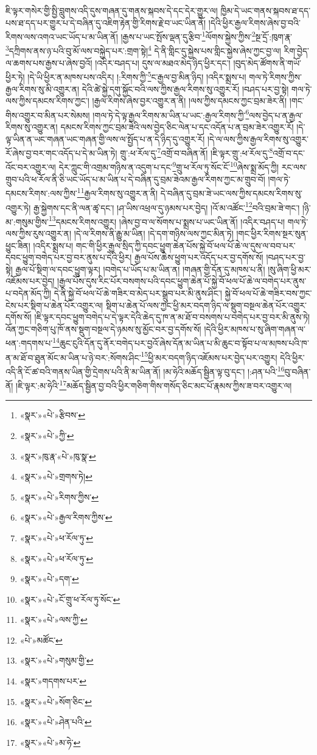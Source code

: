 ཇི་ལྟར་གསེར་གྱི་སྤྱི་བླུགས་འདི་དུས་གཞན་དུ་གནས་སྐབས་དེ་དང་དེར་གྱུར་ལ། ཁྱིམ་དེ་ཡང་གནས་སྐབས་ཐ་དད་པས་ཐ་དད་པར་གྱུར་པ་དེ་བཞིན་དུ་འཇིག་རྟེན་གྱི་རིགས་རྗེ་བ་ཡང་ཡིན་ནོ། །དེའི་ཕྱིར་རྒྱལ་རིགས་ཞེས་བྱ་བའི་རིགས་ལས་འགའ་ཡང་ཡོད་པ་མ་ཡིན་ནོ། །རྒྱས་པ་ཡང་སྤོས་ལྡན་དུ་རྩིབ་\footnote{«སྣར་»«པེ་»རྩིབས་}ལོགས་སྐྱེས་ཀྱིས་\footnote{«སྣར་»«པེ་»ཀྱི་}སྔ་དྲོ་:ཁུག་རྣ་\footnote{«སྣར་»ཁུ་རྣ་«པེ་»ཁུ་སྣ་}དཀྲིགས་ནས་ཉ་པའི་བུ་མོ་ལས་བསྐྱེད་པར་:གྲག་སྟེ།\footnote{«སྣར་»«པེ་»གྲགས་ཏེ།} དེ་ནི་གླིང་དུ་སྐྱེས་པས་གླིང་སྐྱེས་ཞེས་ཀྱང་བྱ་ལ། རིག་བྱེད་ལ་ཆགས་པས་རྒྱས་པ་ཞེས་བྱའོ། །འདིར་བཤད་པ། དུས་ལ་མཐའ་མེད་ཉིད་ཕྱིར་དང་། །བུད་མེད་ཚོགས་ནི་གཡོ་ཕྱིར་ཏེ། །དེ་ཡི་ཕྱིར་ན་མཁས་པས་འདིར། །:རིགས་ཀྱི་\footnote{«སྣར་»«པེ་»རིགས་ཀྱིས་}ང་རྒྱལ་བྱ་མིན་ཉིད། །འདིར་སྨྲས་པ། གལ་ཏེ་རིགས་ཀྱིས་རྒྱལ་རིགས་སུ་མི་འགྱུར་ན། དེའི་ཚེ་སྐྱེ་དགུ་སྐྱོང་བའི་ལས་ཀྱིས་རྒྱལ་རིགས་སུ་འགྱུར་རོ། །བཤད་པར་བྱ་སྟེ། གལ་ཏེ་ལས་ཀྱིས་དམངས་རིགས་ཀྱང་། །རྒྱལ་རིགས་ཞེས་བྱར་འགྱུར་ན་ནི། །ལས་ཀྱིས་དམངས་ཀྱང་བྲམ་ཟེར་ནི། །གང་གིས་འགྱུར་བ་མིན་པར་སེམས། །གལ་ཏེ་དེ་ལྟ་རྒྱལ་རིགས་མ་ཡིན་པ་ཡང་:རྒྱལ་རིགས་ཀྱི་\footnote{«སྣར་»«པེ་»རྒྱལ་རིགས་ཀྱིས་}ལས་བྱེད་པ་ན་རྒྱལ་རིགས་སུ་འགྱུར་ན། དམངས་རིགས་ཀྱང་བྲམ་ཟེའི་ལས་བྱེད་ཅིང་ལེན་པ་དང་འདོན་པ་ན་བྲམ་ཟེར་འགྱུར་རོ། །དེ་ལྟ་ཡིན་ན་ཡང་གཞན་ཡང་གཞན་གྱི་ལས་ལ་སྤྱོད་པ་ན་དེ་ཉིད་དུ་འགྱུར་རོ། །དེ་ལ་ལས་ཀྱིས་རྒྱལ་རིགས་སུ་འགྱུར་རོ་ཞེས་བྱ་བར་གང་འདོད་པ་དེ་མ་ཡིན་ཏེ། གྲུ་:ཕ་རོལ་དུ་\footnote{«སྣར་»«པེ་»ཕ་རོལ་ཏུ་}འགྲོ་བ་བཞིན་ནོ། །ཇི་ལྟར་གྲུ་:ཕ་རོལ་དུ་\footnote{«སྣར་»«པེ་»ཕ་རོལ་ཏུ་}འགྲོ་བ་དང་འོང་བར་འགྱུར་ལ། དེར་ཀླུང་གི་འགྲམ་གཉིས་ན་འདུག་པ་དང་\footnote{«སྣར་»«པེ་»དག་}གྲུ་ཕ་རོལ་ཏུ་སོང་ངོ་\footnote{«སྣར་»«པེ་»ངོ་གྲུ་ཕ་རོལ་ཏུ་སོང་}ཞེས་སྨྲ་མོད་ཀྱི། རང་ལས་གྲུབ་པའི་ཕ་རོལ་ནི་ཅི་ཡང་ཡོད་པ་མ་ཡིན་པ་དེ་བཞིན་དུ་བྲམ་ཟེའམ་རྒྱལ་རིགས་ཀྱང་མ་གྲུབ་བོ། །གལ་ཏེ་དམངས་རིགས་:ལས་ཀྱིས་\footnote{«སྣར་»«པེ་»ལས་ཀྱི་}རྒྱལ་རིགས་སུ་འགྱུར་ན་ནི། དེ་བཞིན་དུ་བྲམ་ཟེ་ཡང་ལས་ཀྱིས་དམངས་རིགས་སུ་འགྱུར་ཏེ། རྒྱ་སྐྱེགས་དང་ནི་ལན་ཚྭ་དང་། །ཤ་ཡིས་འཕྲལ་དུ་ཉམས་པར་བྱེད། །འོ་མ་འཚོང་\footnote{«པེ་»མཚོང་}བའི་བྲམ་ཟེ་གང་། །ཉི་མ་:གསུམ་གྱིས་\footnote{«སྣར་»«པེ་»གསུམ་གྱི་}དམངས་རིགས་འགྱུར། །ཞེས་བྱ་བ་ལ་སོགས་པ་སྨྲས་པ་ཡང་ཡིན་ནོ། །འདིར་བཤད་པ། གལ་ཏེ་ལས་ཀྱིས་རུས་འགྱུར་ན། །དེ་ལ་རིགས་ནི་རྒྱུ་མ་ཡིན། །དེ་དག་གཉིས་ལས་ཀྱང་མིན་ཏེ། །གང་ཕྱིར་རིགས་སྔར་སུན་ཕྱུང་ཟིན། །འདིར་སྨྲས་པ། གང་གི་ཕྱིར་རྒྱལ་སྲིད་ཀྱི་དབང་ཕྱུག་ཆེན་པོས་སྐྱེ་བོ་ཕལ་པོ་ཆེ་ལ་དུས་ལ་བབ་པར་དབང་ཕྱུག་བགེད་པར་བྱ་བར་ནུས་པ་དེའི་ཕྱིར། རྒྱལ་པོས་ཆེས་ཕྱུག་པར་འདོད་པར་བྱ་དགོས་སོ། །བཤད་པར་བྱ་སྟེ། རྒྱལ་པོ་སྡིག་ལ་དབང་ཕྱུག་ལྟར། །བགེད་པ་ཡོད་པ་མ་ཡིན་ན། །གཞན་གྱི་དོན་དུ་མཁས་པ་ནི། །སུ་ཞིག་ཕྱི་མར་འཇོམས་པར་བྱེད། །རྒྱལ་པོས་དུས་རིང་པོར་བསགས་པའི་དབང་ཕྱུག་ཆེན་པོ་སྐྱེ་བོ་ཕལ་པོ་ཆེ་ལ་བགེད་པར་ནུས་པ་བདེན་མོད་ཀྱི། དེ་ནི་སྐྱེ་བོ་ཕལ་པོ་ཆེ་གཟིར་བ་མེད་པར་སྒྲུབ་པར་མི་ནུས་ཤིང་། སྐྱེ་བོ་ཕལ་པོ་ཆེ་གཟིར་བས་ཀྱང་ངེས་པར་སྡིག་པ་ཆེན་པོར་འགྱུར་ལ། སྡིག་པ་ཆེན་པོ་ལས་ཀྱང་ཕྱི་མར་བདག་ཉིད་ལ་སྡུག་བསྔལ་ཆེན་པོར་འགྱུར་དགོས་སོ། །ཇི་ལྟར་དབང་ཕྱུག་བགེད་པ་དེ་ལྟར་དེའི་ཆེད་དུ་ཁ་ན་མ་ཐོ་བ་བསགས་པ་བགེད་པར་བྱ་བར་མི་ནུས་ཏེ། འོན་ཀྱང་གཅིག་པུ་ཁོ་ནས་སྡུག་བསྔལ་དེ་ཉམས་སུ་མྱོང་བར་བྱ་དགོས་སོ། །དེའི་ཕྱིར་མཁས་པ་སུ་ཞིག་གཞན་ལ་ཕན་:གདགས་པ་\footnote{«སྣར་»གདགས་པར་}ཆུང་ངུའི་དོན་དུ་ནོར་བགེད་པར་བྱའོ་ཞེས་དོན་མ་ཡིན་པ་མི་ཆུང་བ་སྟོབ་པ་ལ་མཁས་པའི་ཁ་ན་མ་ཐོ་བ་ཐུན་མོང་མ་ཡིན་པ་ཉེ་བར་:སོགས་ཤིང་\footnote{«སྣར་»«པེ་»སོག་ཅིང་}ཕྱི་མར་བདག་ཉིད་འཇོམས་པར་བྱེད་པར་འགྱུར། དེའི་ཕྱིར་འདི་ནི་ངོ་ཚ་བའི་གནས་ཡིན་གྱི་དྲེགས་པའི་ནི་མ་ཡིན་ནོ། །མ་ཧེའི་མཆོད་སྦྱིན་ལྟ་བུ་དང་། །:ཤན་པའི་\footnote{«སྣར་»«པེ་»ཤེན་པའི་}བུ་བཞིན་ནོ། །ཇི་ལྟར་:མ་ཧེའི་\footnote{«སྣར་»«པེ་»མ་ཧེ་}མཆོད་སྦྱིན་བྱ་བའི་ཕྱིར་གཅིག་གིས་གསོད་ཅིང་མང་པོ་རྣམས་ཀྱིས་ཟ་བར་འགྱུར་ལ། 